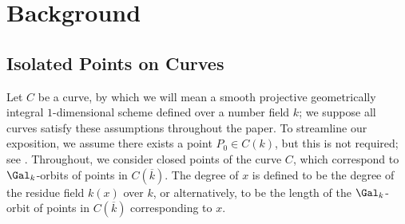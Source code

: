\documentclass[11pt,reqno]{amsart}
\theoremstyle{plain}
\theoremstyle{definition}
\begin{document}
\section{Background}
\label{sec:background}
\subsection{Isolated Points on Curves}
Let $C$ be a curve, by which we will mean a smooth projective geometrically integral $1$-dimensional scheme defined over a number field $k$; we suppose all curves satisfy these assumptions throughout the paper. To streamline our exposition, we assume there exists a point $P_0 \in C(k)$, but this is not required; see \cite[$\S4$]{BELOV}. Throughout, we consider closed points of the curve $C$, which correspond to $\Gal_k$-orbits of points in $C(\overline{k})$. The degree of $x$ is defined to be the degree of the residue field $k(x)$ over $k$, or alternatively, to be the length of the $\Gal_k$-orbit of points in $C(\overline{k})$ corresponding to $x$.
\end{document}

